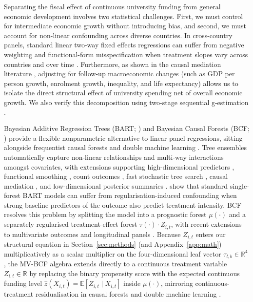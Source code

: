 \documentclass[11pt,a4paper]{article}
\begin{document}
Separating the fiscal effect of continuous university funding from general economic development involves two statistical challenges. First, we must control for intermediate economic growth without introducing bias, and second, we must account for non-linear confounding across diverse countries. In cross-country panels, standard linear two-way fixed effects regressions can suffer from negative weighting and functional-form misspecification when treatment slopes vary across countries and over time \citep{jorda2005estimation, acemoglu2019democracy, dechaisemartin2020two, callaway2021difference}. Furthermore, as shown in the causal mediation literature \citep{imai2010general, acharya2016explaining, vanderweele2016mediation, ting2025estimating}, adjusting for follow-up macroeconomic changes (such as GDP per person growth, enrolment growth, inequality, and life expectancy) allows us to isolate the direct structural effect of university spending net of overall economic growth. We also verify this decomposition using two-stage sequential g-estimation \citep{acharya2016explaining}.

Bayesian Additive Regression Trees (BART; \citealt{chipman2010bart, hill2011bayesian, hill2020bayesian}) and Bayesian Causal Forests (BCF; \citealt{hahn2020bayesian}) provide a flexible nonparametric alternative to linear panel regressions, sitting alongside frequentist causal forests and double machine learning \citep{chernozhukov2018double, athey2019generalized}. Tree ensembles automatically capture non-linear relationships and multi-way interactions amongst covariates, with extensions supporting high-dimensional predictors \citep{linero2018bayesian}, functional smoothing \citep{starling2020bart}, count outcomes \citep{murray2021loglinear}, fast stochastic tree search \citep{krantsevich2023stochastic}, causal mediation \citep{ting2025estimating}, and low-dimensional posterior summaries \citep{woody2021model}. \citet{hahn2020bayesian} show that standard single-forest BART models can suffer from regularisation-induced confounding when strong baseline predictors of the outcome also predict treatment intensity. BCF resolves this problem by splitting the model into a prognostic forest $\mu(\cdot)$ and a separately regularised treatment-effect forest $\tau(\cdot) \cdot Z_{i,t}$, with recent extensions to multivariate outcomes and longitudinal panels \citep{mcjames2024lbcf, mcjames2024mvbcf}. Because $Z_{i,t}$ enters our structural equation in Section~\ref{sec:methods} (and Appendix~\ref{app:math}) multiplicatively as a scalar multiplier on the four-dimensional leaf vector $\tau_{l,b} \in \mathbb{R}^4$, the MV-BCF algebra extends directly to a continuous treatment variable $Z_{i,t} \in \mathbb{R}$ by replacing the binary propensity score with the expected continuous funding level $\hat{z}(X_{i,t}) = \mathbb{E}[Z_{i,t} \mid X_{i,t}]$ inside $\mu(\cdot)$, mirroring continuous-treatment residualisation in causal forests and double machine learning \citep{robinson1988root, hirano2004propensity, chernozhukov2018double, athey2019generalized}.
\end{document}
